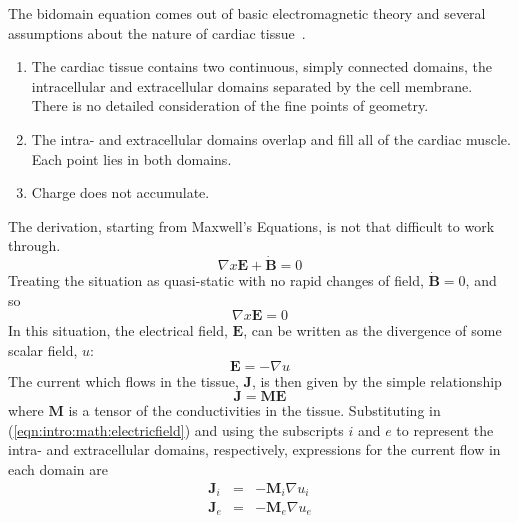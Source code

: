 The bidomain equation comes out of basic electromagnetic theory and several
assumptions about the nature of cardiac tissue~\cite{Tung1978,Geselowitz1983}.
\begin{enumerate}
    \item The cardiac tissue contains two continuous, simply connected domains,
    the intracellular and extracellular domains separated by the cell membrane.
    There is no detailed consideration of the fine points of geometry.
    \item The intra- and extracellular domains overlap and fill all of the cardiac muscle. Each point lies in both domains.
    \item Charge does not accumulate.
\end{enumerate}

The derivation, starting from Maxwell's Equations, is not that difficult to work
through.
\begin{equation}
\label{eqn:intro:math:maxwell}
\nabla x \mathbf{E} + \mathbf{\dot{B}} = 0
\end{equation}
Treating the situation as quasi-static with no rapid changes of field, $\mathbf{\dot{B}} = 0$, and so
\begin{equation}
\label{eqn:intro:math:maxwellqs}
\nabla x \mathbf{E} = 0
\end{equation}
In this situation, the electrical field, $\mathbf{E}$, can be written as the
divergence of some scalar field, $u$:
\begin{equation}
\label{eqn:intro:math:electricfield}
\mathbf{E} = - \nabla u
\end{equation}
The current which flows in the tissue, $\mathbf{J}$, is then given by the simple
relationship
\begin{equation}
\label{eqn:intro:math:current}
\mathbf{J} = \mathbf{M} \mathbf{E}
\end{equation}
where $\mathbf{M}$ is a tensor of the conductivities in the tissue.
Substituting in (\ref{eqn:intro:math:electricfield}) and using the subscripts
$i$ and $e$ to represent the intra- and extracellular domains, respectively,
expressions for the current flow in each domain are
\begin{subequations}
\label{eqn:intro:math:currentsubs}
\begin{align}
\mathbf{J}_i &=& - \mathbf{M}_i \nabla u_i
\label{eqn:intro:math:currenti}\\
\mathbf{J}_e &=& - \mathbf{M}_e \nabla u_e
\label{eqn:intro:math:currente}
\end{align}
\end{subequations}
